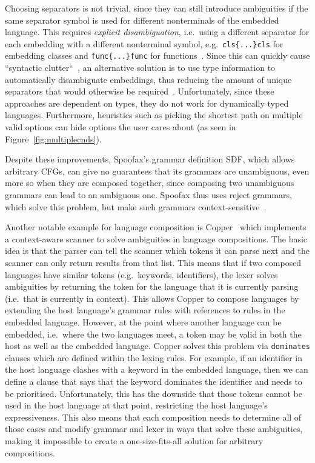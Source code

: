 \documentclass[sigplan,screen]{acmart}\settopmatter{printfolios=true,printccs=false,printacmref=false}
\begin{document}
Choosing separators is not trivial, since they can still introduce ambiguities
if the same separator symbol is used for different nonterminals of the embedded
language. This requires \textit{explicit disambiguation}, i.e.~using a
different separator for each embedding with a different nonterminal symbol,
e.g.~\verb|cls{...}cls| for embedding classes and \verb|func{...}func| for
functions~\cite{batory98jts}. Since this can
quickly cause ``syntactic clutter``~\cite[p.~4]{bravenboer05generalized},
an alternative solution is to use type information to automatically disambiguate
embeddings, thus reducing the amount of unique separators that would otherwise
be required~\cite{zook04generating, bravenboer05generalized}.
Unfortunately, since these approaches are dependent on types, they do not work
for dynamically typed languages. Furthermore, heuristics such as picking the
shortest path on multiple valid options can hide options the user cares about
(as seen in Figure~\ref{fig:multiplecnds}).

Despite these improvements, Spoofax's grammar definition SDF,
which allows arbitrary CFGs, can give no guarantees that its grammars are unambiguous,
even more so when they are composed together, since composing two unambiguous grammars can lead to an ambiguous one.
Spoofax thus uses reject grammars, which solve this problem, but
make such grammars context-sensitive~\cite{eijck__lets_accept_rejects}.

Another notable example for language composition is Copper~\cite{wyk07context}
which implements a context-aware scanner to solve ambiguities in language
compositions. The basic idea is that the parser can tell the scanner which
tokens it can parse next and the scanner can only return results from that list.
This means that if two composed languages have similar tokens (e.g.~keywords,
identifiers), the lexer solves ambiguities
by returning the token for the language that it is currently parsing (i.e.~that is currently in context). This allows
Copper to compose languages by extending the host language's grammar rules
with references to rules in the embedded language. However, at the point where
another language can be embedded, i.e.~where the two languages meet, a token
may be valid in both the host as well as the embedded language.
Copper solves this problem
via \texttt{dominates} clauses which are defined within the lexing rules. For example, if an
identifier in the host language clashes with a keyword in the embedded language,
then we can define a clause that says that the keyword dominates the identifier
and needs to be prioritised. Unfortunately, this has the
downside that those tokens cannot be used in the host language at that point,
restricting the host language's expressiveness. This also means that each
composition needs to determine all of those cases and modify grammar and lexer in ways that solve
these ambiguities, making it impossible to create a one-size-fits-all solution for
arbitrary compositions.
\end{document}
